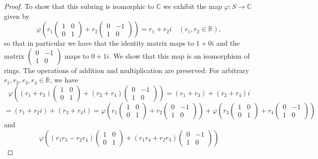 \documentclass[11pt]{article}
\newcommand{\br}[1]{\left(#1\right)}
\begin{document}
\begin{enumerate}
\begin{proof}
        To show that this subring is isomorphic to $\mathbb{C}$ we exhibit the map $\varphi \colon S \to \mathbb{C}$ given by \[\varphi\br{r_1\begin{pmatrix}
            1 & 0 \\ 0 & 1
        \end{pmatrix} + r_2\begin{pmatrix}
            0 & -1 \\ 1 & 0 
        \end{pmatrix}} = r_1 + r_2 i \quad (r_1,r_2\in\mathbb{R}),\] so that in particular we have that the identity matrix maps to $1+0i$ and the matrix $ \begin{pmatrix}
            0 & -1 \\ 1 & 0 
        \end{pmatrix} $ maps to $0+1i$. We show that this map is an isomorphism of rings. The operations of addition and multiplication are preserved: For arbitrary $r_1,r_2,r_3,r_4\in\mathbb{R}$, we have \[\varphi\br{(r_1+r_3)\begin{pmatrix}
            1 & 0 \\ 0 & 1
        \end{pmatrix} + (r_2+r_4)\begin{pmatrix}
            0 & -1 \\ 1 & 0 
        \end{pmatrix}} = (r_1+r_3) + (r_2+r_4)i\] \[ = (r_1+r_2i) + (r_3+r_4i) = \varphi\br{r_1\begin{pmatrix}
            1 & 0 \\ 0 & 1
        \end{pmatrix} + r_2\begin{pmatrix}
            0 & -1 \\ 1 & 0 
        \end{pmatrix}} + \varphi\br{r_3\begin{pmatrix}
            1 & 0 \\ 0 & 1
        \end{pmatrix} + r_4\begin{pmatrix}
            0 & -1 \\ 1 & 0 
        \end{pmatrix}}\] and \[\varphi\br{(r_1r_3 - r_2r_4)\begin{pmatrix}
            1 & 0 \\ 0 & 1
        \end{pmatrix} + (r_1r_4 + r_2r_3)\begin{pmatrix}
            0 & -1 \\ 1 & 0 

\end{pmatrix}}\]
\end{proof}
\end{enumerate}
\end{document}
